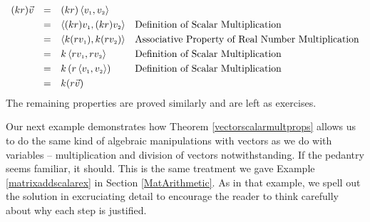 \[\begin{array}{rcll}

(kr) \vec{v} & = & (kr) \left<v_{\mbox{\tiny $1$}},v_{\mbox{\tiny $2$}}\right> & \\ [3pt]
						 & = &  \left<(kr) v_{\mbox{\tiny $1$}}, (kr) v_{\mbox{\tiny $2$}}\right> & \text{Definition of Scalar Multiplication} \\ [3pt]
						 & = &   \left<k (r v_{\mbox{\tiny $1$}}),  k (r v_{\mbox{\tiny $2$}})\right> & \text{Associative Property of Real Number Multiplication} \\ [3pt]
						 & = &   k\left<r v_{\mbox{\tiny $1$}},  r v_{\mbox{\tiny $2$}}\right> & \text{Definition of Scalar Multiplication} \\ [3pt]	
 						 & = &   k\left(r\left<v_{\mbox{\tiny $1$}}, v_{\mbox{\tiny $2$}}\right>\right) & \text{Definition of Scalar Multiplication} \\ [3pt]
						 & = & k(r\vec{v}) & \\ \end{array} \]
The remaining properties are proved similarly and are left as exercises.

\smallskip

Our next example demonstrates how Theorem \ref{vectorscalarmultprops} allows us to do the same kind of algebraic manipulations with vectors as we do with variables -- multiplication and division of vectors notwithstanding.  If the pedantry seems familiar, it should.  This is the same treatment we gave Example \ref{matrixaddscalarex} in Section \ref{MatArithmetic}.  As in that example,  we spell out the solution in excruciating detail to encourage the reader to think carefully about why each step is justified.



